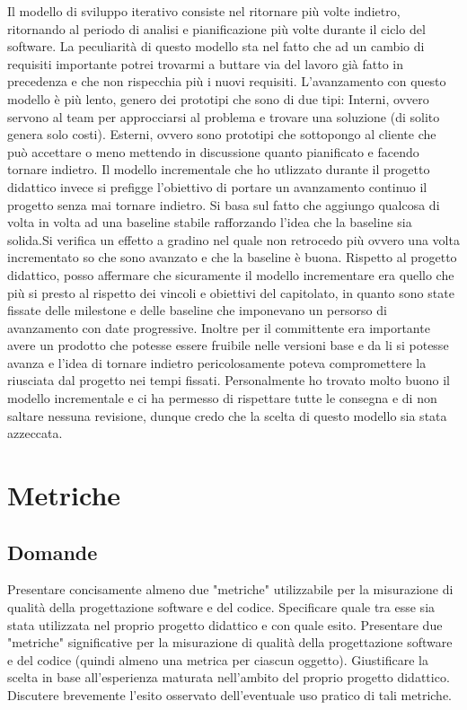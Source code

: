 Il modello di sviluppo iterativo consiste nel ritornare più volte indietro, ritornando al periodo di analisi e pianificazione
più volte durante il ciclo del software. La peculiarità di questo modello sta nel fatto che ad un cambio di requisiti
importante potrei trovarmi a buttare via del lavoro già fatto in precedenza e che non rispecchia più i nuovi requisiti.
L'avanzamento con questo modello è più lento, genero dei prototipi che sono di due tipi:
Interni, ovvero servono al team per approcciarsi al problema e trovare una soluzione (di solito genera solo costi).
Esterni, ovvero sono prototipi che sottopongo al cliente che può accettare o meno mettendo in discussione quanto
pianificato e facendo tornare indietro.
Il modello incrementale che ho utlizzato durante il progetto didattico invece si prefigge l'obiettivo di portare un
avanzamento continuo il progetto senza mai tornare indietro.
Si basa sul fatto che aggiungo qualcosa di volta in volta ad una baseline stabile rafforzando l'idea che la baseline sia
solida.Si verifica un effetto a gradino nel quale non retrocedo più ovvero una volta incrementato so che sono avanzato e
che la baseline è buona.
Rispetto al progetto didattico, posso affermare che sicuramente il modello incrementare era quello che più si presto al
rispetto dei vincoli e obiettivi del capitolato, in quanto sono state fissate delle milestone e delle baseline che
imponevano un persorso di avanzamento con date progressive. Inoltre per il committente era importante avere un
prodotto che potesse essere fruibile nelle versioni base e da li si potesse avanza e l'idea di tornare indietro
pericolosamente poteva compromettere la riusciata dal progetto nei tempi fissati.
Personalmente ho trovato molto buono il modello incrementale e ci ha permesso di rispettare tutte le consegna e di non
saltare nessuna revisione, dunque credo che la scelta di questo modello sia stata azzeccata.

\section{Metriche}

\subsection*{Domande}
Presentare concisamente almeno due "metriche" utilizzabile per la misurazione di qualità della progettazione software e del codice. Specificare quale tra esse sia stata utilizzata nel proprio progetto didattico e con quale esito.
Presentare due "metriche" significative per la misurazione di qualità della progettazione software e del codice (quindi almeno una metrica per ciascun oggetto). Giustificare la scelta in base all'esperienza maturata nell'ambito del proprio progetto didattico. Discutere brevemente l'esito osservato dell'eventuale uso pratico di tali metriche.\\

